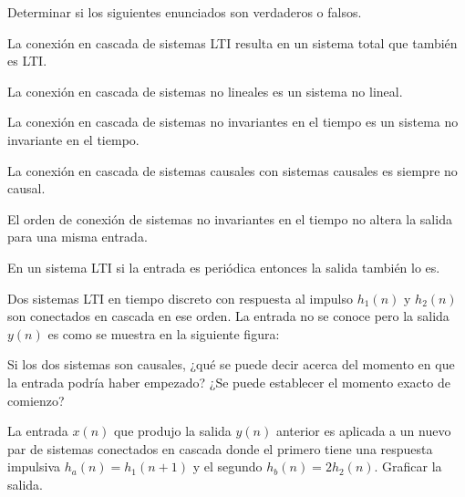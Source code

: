     \begin{ejercicio}
    Determinar si los siguientes enunciados son verdaderos o falsos.
    
    \inciso La conexión en cascada de sistemas LTI resulta en un sistema total que también es LTI.
    
    \inciso La conexión en cascada de sistemas no lineales es un sistema no lineal.
    
    \inciso La conexión en cascada de sistemas no invariantes en el tiempo es un sistema no invariante en el tiempo.
    
    \inciso La conexión en cascada de sistemas causales con sistemas causales es siempre no causal.
    
    \inciso El orden de conexión de sistemas no invariantes en el tiempo no altera la salida para una misma entrada.
    
    \inciso En un sistema LTI si la entrada es periódica entonces la salida también lo es.
    \end{ejercicio}
    
    \begin{ejercicio}
    Dos sistemas LTI en tiempo discreto con respuesta al impulso $h_1(n)$ y $h_2(n)$ son conectados en cascada en ese orden. La entrada no se conoce pero la salida $y(n)$ es como se muestra en la siguiente figura:
    \begin{center}
        
    \end{center}
    
    \inciso Si los dos sistemas son causales, ¿qué se puede decir acerca del momento en que la entrada podría haber empezado? ¿Se puede establecer el momento exacto de comienzo?
    
    \inciso La entrada $x(n)$ que produjo la salida $y(n)$ anterior es aplicada a un nuevo par de sistemas conectados en cascada donde el primero tiene una respuesta impulsiva $h_a(n) = h_1(n + 1)$ y el segundo $h_b(n) = 2h_2(n)$. Graficar la salida.
    \end{ejercicio}
    
